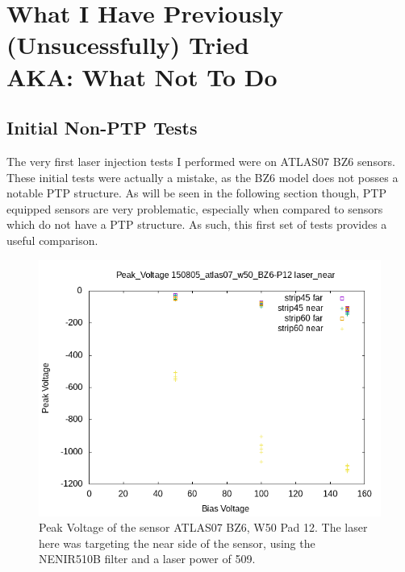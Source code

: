 \documentclass{report}
\begin{document}
            



    \chapter{ What I Have Previously (Unsucessfully) Tried\\ AKA: What Not To Do }
        \section{Initial Non-PTP Tests}
            The very first laser injection tests I performed were on ATLAS07 BZ6 sensors. These initial tests were actually a mistake, as the BZ6 model does not posses a notable PTP structure. As will be seen in the following section though, PTP equipped sensors are very problematic, especially when compared to sensors which do not have a PTP structure. As such, this first set of tests provides a useful comparison.

            \begin{figure}[h] 
                \includegraphics[height=.4\textheight]{Peak_Voltage__150805_atlas07_w50_BZ6-P12__laser_near}
                \centering
                \caption{ Peak Voltage of the sensor ATLAS07 BZ6, W50 Pad 12. The laser here was targeting the near side of the sensor, using the NENIR510B filter and a laser power of 509. }
                \label{fig:Peak_Voltage__150805_atlas07_w50_BZ6-P12__laser_near}
            \end{figure}
\end{document}
